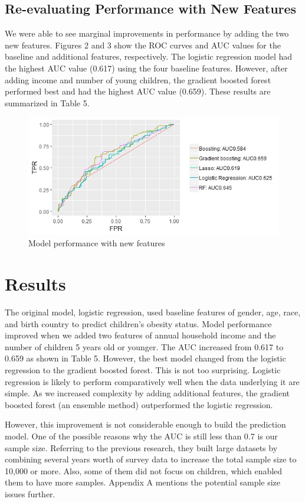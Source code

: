 \documentclass[twoside,11pt]{article}
\begin{document}
\subsection{Re-evaluating Performance with New Features} 
We were able to see marginal improvements in performance by adding the two new features. Figures 2 and 3 show the ROC curves and AUC values for the baseline and additional features, respectively. The logistic regression model had the highest AUC value (0.617) using the four baseline features. However, after adding income and number of young children, the gradient boosted forest performed best and had the highest AUC value (0.659). These results are summarized in Table 5.  


\begin{figure}[h]
  \centering 
  \includegraphics[width=6in]{NewFeatures.jpeg}
  \caption{Model performance with new features}
  \label{} 
\end{figure} 


\section{Results} \label{results}
The original model, logistic regression, used baseline features of gender, age, race, and birth country to predict children's obesity status. Model performance improved when we added two features of annual household income and the number of children 5 years old or younger. The AUC increased from 0.617 to 0.659 as shown in Table 5. However, the best model changed from the logistic regression to the gradient boosted forest. This is not too surprising. Logistic regression is likely to perform comparatively well when the data underlying it are simple. As we increased complexity by adding additional features, the gradient boosted forest (an ensemble method) outperformed the logistic regression. 

However, this improvement is not considerable enough to build the prediction model. One of the possible reasons why the AUC is still less than 0.7 is our sample size. Referring to the previous research, they built large datasets by combining several years worth of survey data to increase the total sample size to 10,000 or more. Also, some of them did not focus on children, which enabled them to have more samples. Appendix A mentions the potential sample size issues further. 
\end{document}
